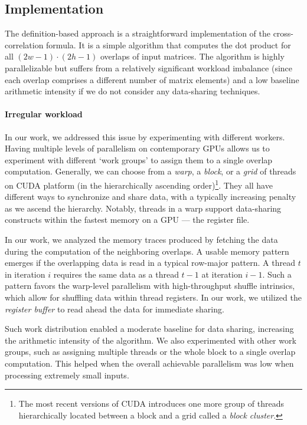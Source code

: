 \subsection{Implementation}

The definition-based approach is a straightforward implementation of the cross-correlation formula. It is a simple algorithm that computes the dot product for all $(2w - 1) \cdot (2h -1)$ overlaps of input matrices. The algorithm is highly parallelizable but suffers from a relatively significant workload imbalance (since each overlap comprises a different number of matrix elements) and a low baseline arithmetic intensity if we do not consider any data-sharing techniques. 

\paragraph{Irregular workload} In our work, we addressed this issue by experimenting with different workers. Having multiple levels of parallelism on contemporary GPUs allows us to experiment with different `work groups' to assign them to a single overlap computation. Generally, we can choose from a \emph{warp}, a \emph{block}, or a \emph{grid} of threads on CUDA platform (in the hierarchically ascending order)\footnote{The most recent versions of CUDA introduces one more group of threads hierarchically located between a block and a grid called a \emph{block cluster}.}. They all have different ways to synchronize and share data, with a typically increasing penalty as we ascend the hierarchy. Notably, threads in a warp support data-sharing constructs within the fastest memory on a GPU --- the register file. 

In our work, we analyzed the memory traces produced by fetching the data during the computation of the neighboring overlaps. A usable memory pattern emerges if the overlapping data is read in a typical row-major pattern. A thread $t$ in iteration $i$ requires the same data as a thread $t-1$ at iteration $i-1$. Such a pattern favors the warp-level parallelism with high-throughput shuffle intrinsics, which allow for shuffling data within thread registers. In our work, we utilized the \emph{register buffer} to read ahead the data for immediate sharing.

Such work distribution enabled a moderate baseline for data sharing, increasing the arithmetic intensity of the algorithm. We also experimented with other work groups, such as assigning multiple threads or the whole block to a single overlap computation. This helped when the overall achievable parallelism was low when processing extremely small inputs.

